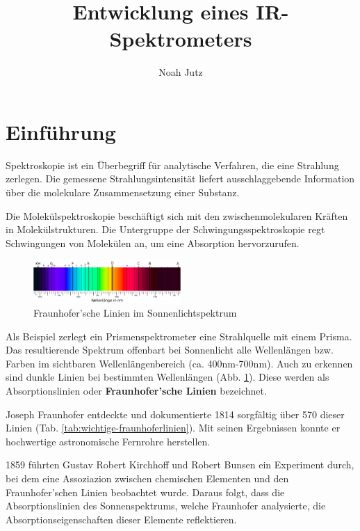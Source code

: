 \documentclass{article}
\title{Entwicklung eines IR-Spektrometers}
\author{Noah Jutz}
\date{}
\begin{document}
\maketitle
\tableofcontents

\newpage
\section{Einführung}
Spektroskopie ist ein Überbegriff für analytische Verfahren, die eine Strahlung zerlegen. Die gemessene Strahlungsintensität liefert ausschlaggebende Information über die molekulare Zusammensetzung einer Substanz.

Die Molekülspektroskopie beschäftigt sich mit den zwischenmolekularen Kräften in Molekülstrukturen. Die Untergruppe der Schwingungsspektroskopie regt Schwingungen von Molekülen an, um eine Absorption hervorzurufen.

\begin{figure}
    \centering
    \includegraphics[width=0.5\textwidth]{fraunhofer_linien.png}
    \caption{Fraunhofer'sche Linien im Sonnenlichtspektrum}
    \label{fig:fraunhofer-linien}
\end{figure}

Als Beispiel zerlegt ein Prismenspektrometer eine Strahlquelle mit einem Prisma. Das resultierende Spektrum offenbart bei Sonnenlicht alle Wellenlängen bzw. Farben im sichtbaren Wellenlängenbereich (ca. 400nm-700nm). Auch zu erkennen sind dunkle Linien bei bestimmten Wellenlängen (Abb. \ref{fig:fraunhofer-linien}). Diese werden als Absorptionslinien oder \textbf{Fraunhofer'sche Linien} bezeichnet.

Joseph Fraunhofer entdeckte und dokumentierte 1814 sorgfältig über 570 dieser Linien (Tab. \ref{tab:wichtige-fraunhoferlinien}). Mit seinen Ergebnissen konnte er hochwertige astronomische Fernrohre herstellen.

1859 führten Gustav Robert Kirchhoff und Robert Bunsen ein Experiment durch, bei dem eine Assoziazion zwischen chemischen Elementen und den Fraunhofer'schen Linien beobachtet wurde. Daraus folgt, dass die Absorptionslinien des Sonnenspektrums, welche Fraunhofer analysierte, die Absorptionseigenschaften dieser Elemente reflektieren.
\end{document}
